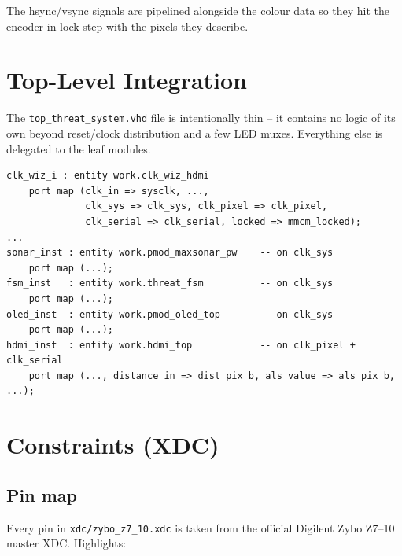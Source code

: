 \documentclass[11pt,a4paper]{article}
\begin{document}
The hsync/vsync signals are pipelined alongside the colour data so
they hit the encoder in lock-step with the pixels they describe.

\section{Top-Level Integration}

The \texttt{top\_threat\_system.vhd} file is intentionally thin -- it
contains no logic of its own beyond reset/clock distribution and a few
LED muxes.  Everything else is delegated to the leaf modules.

\begin{lstlisting}[caption={Top-level fan-out (abbreviated).}]
clk_wiz_i : entity work.clk_wiz_hdmi
    port map (clk_in => sysclk, ...,
              clk_sys => clk_sys, clk_pixel => clk_pixel,
              clk_serial => clk_serial, locked => mmcm_locked);
...
sonar_inst : entity work.pmod_maxsonar_pw    -- on clk_sys
    port map (...);
fsm_inst   : entity work.threat_fsm          -- on clk_sys
    port map (...);
oled_inst  : entity work.pmod_oled_top       -- on clk_sys
    port map (...);
hdmi_inst  : entity work.hdmi_top            -- on clk_pixel + clk_serial
    port map (..., distance_in => dist_pix_b, als_value => als_pix_b, ...);
\end{lstlisting}

\section{Constraints (XDC)}

\subsection{Pin map}

Every pin in \texttt{xdc/zybo\_z7\_10.xdc} is taken from the official
Digilent Zybo Z7--10 master XDC.  Highlights:
\end{document}
